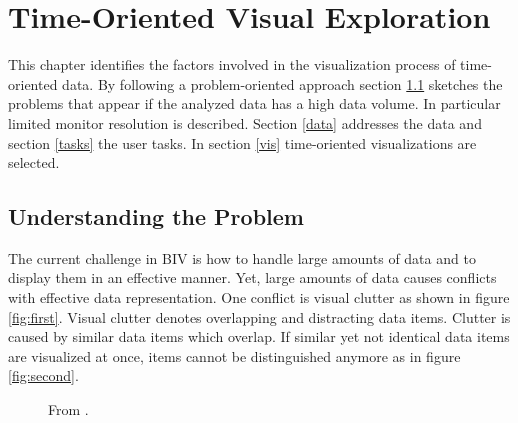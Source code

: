 \chapter{Time-Oriented Visual Exploration}\label{chap:basics}

This chapter identifies the factors involved in the visualization process of time-oriented data. By following a problem-oriented approach section \ref{problems} sketches the problems that appear if the analyzed data has a high data volume. In particular limited monitor resolution is described. Section \ref{data} addresses the data and section \ref{tasks} the user tasks. In section \ref{vis} time-oriented visualizations are selected.

 \section{Understanding the Problem}\label{problems}
The current challenge in \gls{BIV}  is how to handle large amounts of data and to display them in an effective manner. Yet, large amounts of data causes conflicts with effective data representation. One conflict is visual clutter as shown in figure \ref{fig:first}. Visual clutter denotes overlapping and distracting data items. Clutter is caused by similar data items which overlap. If similar yet not identical data items are visualized at once, items cannot be distinguished anymore as in figure \ref{fig:second}. 
 
\begin{figure}
 \centering
{}
\qquad
{}
\caption[Parallel Coordinates]{From \cite{Tatu2010}.}
\end{figure}
 
